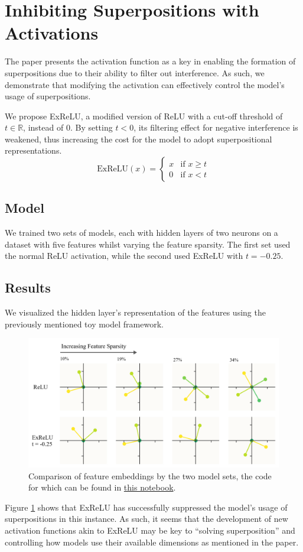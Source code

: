 \section{Inhibiting Superpositions with Activations}
\label{sec:act_fns}
The paper presents the activation function as a key in enabling the formation of superpositions due to their ability to
filter out interference. As such, we demonstrate that modifying the activation can effectively control the model's usage of
superpositions.

We propose ExReLU, a modified version of ReLU with a cut-off threshold of $t \in \mathbb{R}$, instead of $0$. By setting $t < 0$, its filtering effect for negative interference is weakened, thus
increasing the cost for the model to adopt superpositional representations.
\[
	\text{ExReLU}(x) =
	\begin{cases}
		x & \text{if } x \geq t \\
		0 & \text{if } x < t
	\end{cases}
\]

\subsection{Model}
We trained two sets of models, each with hidden layers of two neurons on a dataset with five features whilst varying the feature
sparsity. The first set used the normal ReLU activation, while the second used ExReLU with $t=-0.25$.

\subsection{Results}
We visualized the hidden layer's representation of the features using the previously mentioned toy model framework.
\begin{figure}[h]
	\centering
	\includegraphics[width=1\linewidth]{figures/acts_diagram.png}
	\caption{Comparison of feature embeddings by the two model sets, the code for which can be found in \href{https://colab.research.google.com/github/smurphnerd/FIT5047-assignment4/blob/main/act_visuals.ipynb}{this notebook}.}
	\label{fig:acts_diagram}
\end{figure}
Figure \ref{fig:acts_diagram} shows that ExReLU has successfully suppressed the model's usage of superpositions in this instance.
As such, it seems that the development of new activation functions akin to ExReLU may be key to ``solving superposition'' and controlling how models
use their available dimensions as mentioned in the paper.

